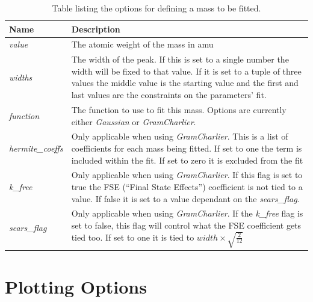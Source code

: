 \documentclass[paper=a4, fontsize=11pt]{scrartcl}	%
\numberwithin{equation}{section}															%
\numberwithin{figure}{section}																%
\numberwithin{table}{section}
\begin{document}
\begin{appendices}
\begin{table}[H]
\centering
\begin{tabular}{ l p{12cm}}
Name & Description \\ \hline
\textit{value} & The atomic weight of the mass in amu \\ \hline
\textit{widths} & The width of the peak. If this is set to a single number the width will be fixed to that value. If it is set to a tuple of three values the middle value is the starting value and the first and last values are the constraints on the parameters' fit. \\ \hline
\textit{function} & The function to use to fit this mass. Options are currently either \textit{Gaussian} or \textit{GramCharlier}. \\ \hline
\textit{hermite\_coeffs} & Only applicable when using \textit{GramCharlier}. This is a list of coefficients for each mass being fitted. If set to one the term is included within the fit. If set to zero it is excluded from the fit\\ \hline
\textit{k\_free} & Only applicable when using \textit{GramCharlier}. If this flag is set to true the FSE (``Final State Effects'') coefficient is not tied to a value. If false it is set to a value dependant on the \textit{sears\_flag}.\\ \hline
\textit{sears\_flag} & Only applicable when using \textit{GramCharlier}. If the \textit{k\_free} flag is set to false, this flag will control what the FSE coefficient gets tied too. If set to one it is tied to $width\times\sqrt{\frac{2}{12}}$\\ \hline
\end{tabular}
\caption{Table listing the options for defining a mass to be fitted.}
\label{table:mass-parameters}
\end{table}

\section{Plotting Options}
\label{sec:plotting-options}


\end{appendices}
\end{document}

